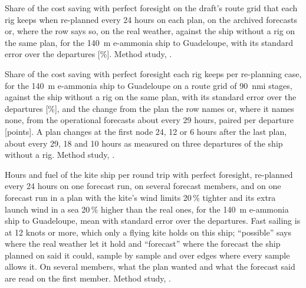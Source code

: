 \begin{table}[tbp]
\centering
\footnotesize
\caption{Share of the cost saving with perfect foresight on the draft's route grid that each rig keeps when re-planned every 24 hours on each plan, on the archived forecasts or, where the row says so, on the real weather, against the ship without a rig on the same plan, for the \SI{140}{m} e-ammonia ship to Guadeloupe, with its standard error over the departures [\%].  Method study, .}
\label{tab:forecast_plans}

\end{table}
\begin{table}[tbp]
\centering
\footnotesize
\caption{ Share of the cost saving with perfect foresight each rig keeps per re-planning case, for the \SI{140}{m} e-ammonia ship to Guadeloupe on a route grid of \SI{90}{nmi} stages, against the ship without a rig on the same plan, with its standard error over the departures [\%], and the change from the plan the row names or, where it names none, from the operational forecasts about every 29 hours, paired per departure [points]. A plan changes at the first node 24, 12 or 6 hours after the last plan, about every 29, 18 and 10 hours as measured on three departures of the ship without a rig.  Method study, .}
\label{tab:forecast_replanning}

\end{table}
\begin{table}[tbp]
\centering
\footnotesize
\caption{Hours and fuel of the kite ship per round trip with perfect foresight, re-planned every 24 hours on one forecast run, on several forecast members, and on one forecast run in a plan with the kite's wind limits 20\,\% tighter and its extra launch wind in a sea 20\,\% higher than the real ones, for the \SI{140}{m} e-ammonia ship to Guadeloupe, mean with standard error over the departures. Fast sailing is at 12 knots or more, which only a flying kite holds on this ship; ``possible'' says where the real weather let it hold and ``forecast'' where the forecast the ship planned on said it could, sample by sample and over edges where every sample allows it. On several members, what the plan wanted and what the forecast said are read on the first member.  Method study, .}
\label{tab:forecast_hours}

\end{table}
